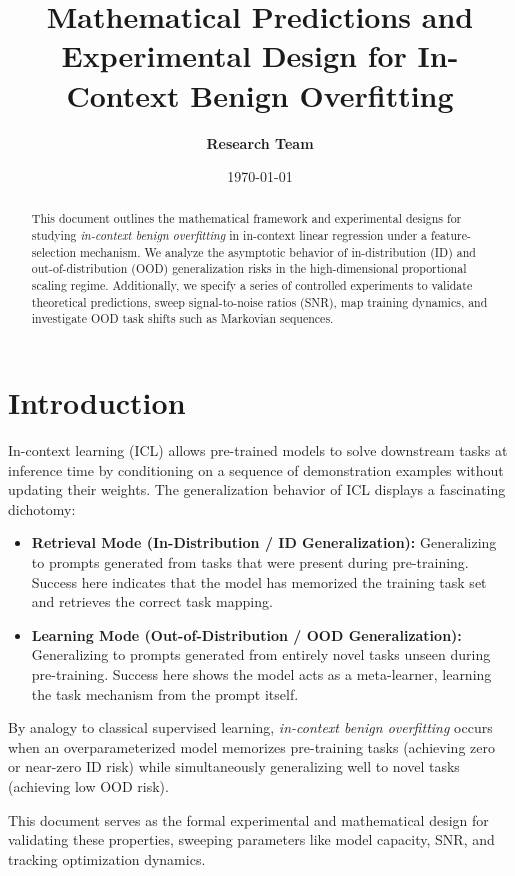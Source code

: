 \documentclass[11pt,a4paper]{article}
\title{\textbf{Mathematical Predictions and Experimental Design for In-Context Benign Overfitting}}
\author{\textbf{Research Team}}
\date{\today}
\begin{document}
\maketitle

\begin{abstract}
This document outlines the mathematical framework and experimental designs for studying \textit{in-context benign overfitting} in in-context linear regression under a feature-selection mechanism. We analyze the asymptotic behavior of in-distribution (ID) and out-of-distribution (OOD) generalization risks in the high-dimensional proportional scaling regime. Additionally, we specify a series of controlled experiments to validate theoretical predictions, sweep signal-to-noise ratios (SNR), map training dynamics, and investigate OOD task shifts such as Markovian sequences.
\end{abstract}

\section{Introduction}
In-context learning (ICL) allows pre-trained models to solve downstream tasks at inference time by conditioning on a sequence of demonstration examples without updating their weights. The generalization behavior of ICL displays a fascinating dichotomy:
\begin{itemize}
    \item \textbf{Retrieval Mode (In-Distribution / ID Generalization):} Generalizing to prompts generated from tasks that were present during pre-training. Success here indicates that the model has memorized the training task set and retrieves the correct task mapping.
    \item \textbf{Learning Mode (Out-of-Distribution / OOD Generalization):} Generalizing to prompts generated from entirely novel tasks unseen during pre-training. Success here shows the model acts as a meta-learner, learning the task mechanism from the prompt itself.
\end{itemize}

By analogy to classical supervised learning, \textit{in-context benign overfitting} occurs when an overparameterized model memorizes pre-training tasks (achieving zero or near-zero ID risk) while simultaneously generalizing well to novel tasks (achieving low OOD risk).

This document serves as the formal experimental and mathematical design for validating these properties, sweeping parameters like model capacity, SNR, and tracking optimization dynamics.
\end{document}
